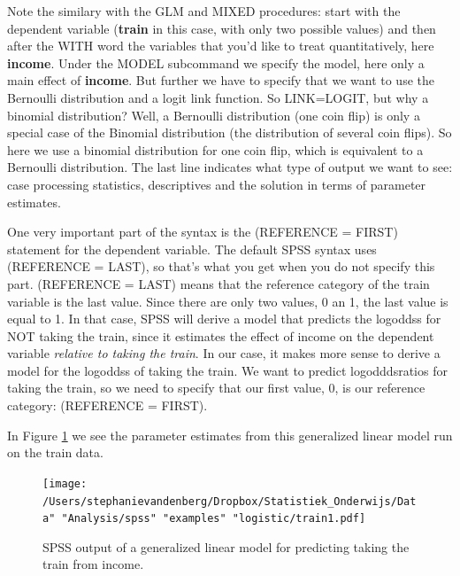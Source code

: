 \documentclass[]{book}\usepackage[]{graphicx}\usepackage[]{color}
\begin{document}
Note the similary with the GLM and MIXED procedures: start with the dependent variable (\textbf{train} in this case, with only two possible values) and then after the WITH word the variables that you'd like to treat quantitatively, here \textbf{income}. Under the MODEL subcommand we specify the model, here only a main effect of \textbf{income}. But further we have to specify that we want to use the Bernoulli distribution and a logit link function. So LINK=LOGIT, but why a binomial distribution? Well, a Bernoulli distribution (one coin flip) is only a special case of the Binomial distribution (the distribution of several coin flips). So here we use a binomial distribution for one coin flip, which is equivalent to a Bernoulli distribution. The last line indicates what type of output we want to see: case processing statistics, descriptives and the solution in terms of parameter estimates.

One very important part of the syntax is the (REFERENCE = FIRST) statement for the dependent variable. The default SPSS syntax uses (REFERENCE = LAST), so that's what you get when you do not specify this part. (REFERENCE = LAST) means that the reference category of the train variable is the last value. Since there are only two values, 0 an 1, the last value is equal to 1. In that case, SPSS will derive a model that predicts the logoddss for NOT taking the train, since it estimates the effect of income on the dependent variable \textit{relative to taking the train}. In our case, it makes more sense to derive a model for the logoddss of taking the train. We want to predict logodddsratios for taking the train, so we need to specify that our first value, 0, is our reference category: (REFERENCE = FIRST).


In Figure \ref{fig:train1} we see the parameter estimates from this generalized linear model run on the train data.


\begin{figure}[h]
    \begin{center}
       \texttt{[image: /Users/stephanievandenberg/Dropbox/Statistiek\_Onderwijs/Data" "Analysis/spss" "examples" "logistic/train1.pdf]}
    \end{center}
     \caption{SPSS output of a generalized linear model for predicting taking the train from income.}
    \label{fig:train1}
\end{figure}
\end{document}
